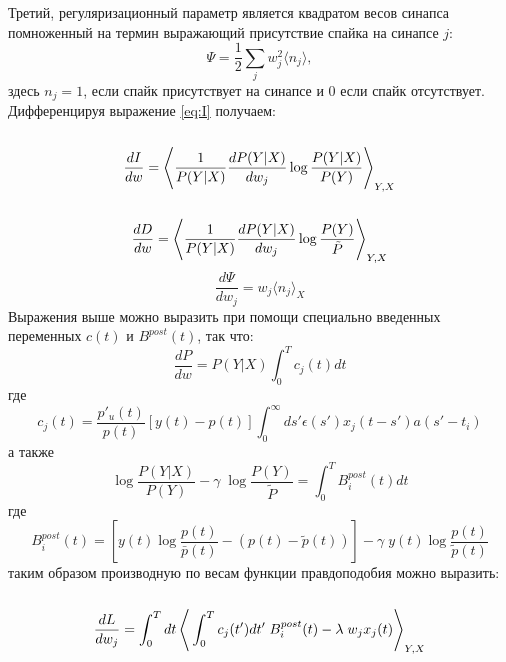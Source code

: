 \documentclass[a4paper,10pt]{article}
\def\la{\left\langle\rule{0pt}{3em}}
\def\ra{\right\rangle}
\begin{document}
\indent Третий, регуляризационный параметр является квадратом весов синапса помноженный на термин выражающий присутствие спайка на синапсе $j$:
\begin{equation}\label{eq:reg}
\Psi=\frac{1}{2}\sum_{j}w_{j}^2\langle n_{j} \rangle, 
\end{equation} 
здесь $n_{j}=1$, если спайк присутствует на синапсе и 0 если спайк отсутствует.
\indent Дифференцируя выражение \ref{eq:I} получаем:
\begin{equation}
\frac{dI}{dw} = \la \frac{1}{P(Y|X)}\frac{dP(Y|X)}{dw_{j}}\log\frac{P(Y|X)}{P(Y)} \ra_{Y,X}
\end{equation} 
\begin{equation}
\frac{dD}{dw} = \la \frac{1}{P(Y|X)}\frac{dP(Y|X)}{dw_{j}}\log\frac{P(Y)}{\tilde{P}} \ra_{Y,X}
\end{equation}
\begin{equation}
\frac{d\Psi}{dw_{j}} = w_{j} \langle n_{j} \rangle_{X}
\end{equation} 
\indent Выражения выше можно выразить при помощи специально введенных переменных $c(t)$ и $B^{post}(t)$, так что:
\begin{equation}
\frac{dP}{dw} = P(Y|X)\int_{0}^{T} c_{j}(t)dt
\end{equation} 
где
\begin{equation}
c_{j}(t) = \frac{p'_{u}(t)}{p(t)}[y(t)-p(t)]\int_{0}^{\infty}ds'\epsilon(s') x_{j}(t-s')a(s'-t_{i}) 
\end{equation} 
а также
\begin{equation}
\log\frac{P(Y|X)}{P(Y)} - \gamma \; \log\frac{P(Y)}{\tilde{P}} = \int_{0}^{T}B^{post}_{i}(t)dt
\end{equation} 
где
\begin{equation}
B^{post}_{i}(t) = [y(t)\log \frac{p(t)}{\bar{p}(t)} - (p(t)-\tilde{p}(t))]-\gamma \; y(t)\log \frac{{p}(t)}{\tilde{p}(t)}
\end{equation} 
таким образом производную по весам функции правдоподобия можно выразить:
\begin{equation}\label{eq:lh_dw}
\frac{dL}{dw_{j}} = \int_{0}^{T}dt \la \int_{0}^{T} c_{j}(t')dt' \; B^{post}_{i}(t) - \lambda \; w_{j}x_{j}(t) \ra_{Y,X}
\end{equation}
\end{document}
